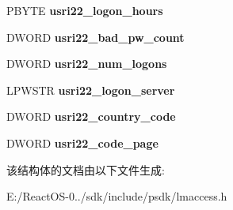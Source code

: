 \begin{DoxyCompactItemize}
\item 
\mbox{\label{struct___u_s_e_r___i_n_f_o__22_ae0c64a6fdb7f4e7c252dd87fc0964563}} 
P\+B\+Y\+TE {\bfseries usri22\+\_\+logon\+\_\+hours}
\item 
\mbox{\label{struct___u_s_e_r___i_n_f_o__22_a94c24fb2b17bff9c48fd0abb3c1a2976}} 
D\+W\+O\+RD {\bfseries usri22\+\_\+bad\+\_\+pw\+\_\+count}
\item 
\mbox{\label{struct___u_s_e_r___i_n_f_o__22_a114fe26881a46328c178610b95526e0e}} 
D\+W\+O\+RD {\bfseries usri22\+\_\+num\+\_\+logons}
\item 
\mbox{\label{struct___u_s_e_r___i_n_f_o__22_a7bba8a5a08673986d50c9ff0d68621fa}} 
L\+P\+W\+S\+TR {\bfseries usri22\+\_\+logon\+\_\+server}
\item 
\mbox{\label{struct___u_s_e_r___i_n_f_o__22_a594a290a8dc000941cc390386f3d7fc5}} 
D\+W\+O\+RD {\bfseries usri22\+\_\+country\+\_\+code}
\item 
\mbox{\label{struct___u_s_e_r___i_n_f_o__22_ad35c3a976c2818983cacc23e4e1946d1}} 
D\+W\+O\+RD {\bfseries usri22\+\_\+code\+\_\+page}
\end{DoxyCompactItemize}


该结构体的文档由以下文件生成\+:\begin{DoxyCompactItemize}
\item 
E\+:/\+React\+O\+S-\/0../sdk/include/psdk/lmaccess.\+h\end{DoxyCompactItemize}
